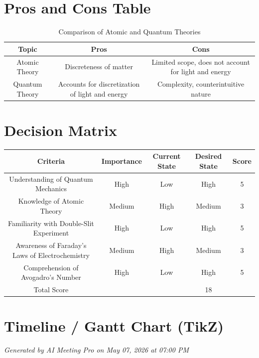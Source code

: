 \documentclass{article}
\begin{document}
\section*{Pros and Cons Table}
\begin{table}[h]
    \centering
    \begin{tabular}{|c|c|c|}
        \hline
        Topic & Pros & Cons \\
        \hline
        Atomic Theory & Discreteness of matter & Limited scope, does not account for light and energy \\
        \hline
        Quantum Theory & Accounts for discretization of light and energy & Complexity, counterintuitive nature \\
        \hline
    \end{tabular}
    \caption{Comparison of Atomic and Quantum Theories}
\end{table}

\section*{Decision Matrix}
\begin{tcolorbox}[enhanced, boxrule=0pt, colback=white]
    \begin{tabular}{|c|c|c|c|c|}
        \hline
        Criteria & Importance & Current State & Desired State & Score \\
        \hline
        Understanding of Quantum Mechanics & High & Low & High & 5 \\
        \hline
        Knowledge of Atomic Theory & Medium & High & Medium & 3 \\
        \hline
        Familiarity with Double-Slit Experiment & High & Low & High & 5 \\
        \hline
        Awareness of Faraday's Laws of Electrochemistry & Medium & High & Medium & 3 \\
        \hline
        Comprehension of Avogadro's Number & High & Low & High & 5 \\
        \hline
        Total Score & & & 18 \\
        \hline
    \end{tabular}
\end{tcolorbox}

\section*{Timeline / Gantt Chart (TikZ)}

\vfill
\begin{center}
\footnotesize \textit{Generated by AI Meeting Pro on May 07, 2026 at 07:00 PM}
\end{center}
\end{document}
